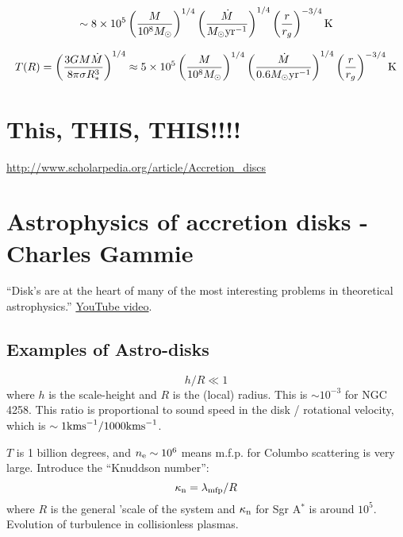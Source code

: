 \documentclass[11pt,a4paper]{article}
\begin{document}
\smallskip
\smallskip
\noindent
\begin{equation*}
  \sim 8 \times 10^{5}    \left(   \frac{M}{10^{8} M_{\odot}}   \right  )^{1/4}  \left(  \frac{\dot{M}}{M_{\odot} {\rm yr^{-1}}}  \right )^{1/4} \left ( \frac{r}{r_{g}} \right )^{-3/4}  {\rm K} \\
\end{equation*}

\smallskip
\smallskip
\noindent
\begin{equation*}
T(R) = \left ( \frac{3 G M \dot{M}}{8 \pi \sigma R^{3}_{*}}  \right )^{1/4}   
  \approx 5 \times 10^{5}    \left(   \frac{M}{10^{8} M_{\odot}}   \right  )^{1/4}  \left(  \frac{\dot{M}}{0.6 M_{\odot} {\rm yr^{-1}}}  \right )^{1/4} \left ( \frac{r}{r_{g}} \right )^{-3/4}  {\rm K} \\
\end{equation*}


\section{This, THIS, THIS!!!!}
\href{http://www.scholarpedia.org/article/Accretion\_discs}{http://www.scholarpedia.org/article/Accretion\_discs}


\newpage
\section{Astrophysics of accretion disks - Charles Gammie}

``Disk's are at the heart of many of the most interesting problems in
theoretical astrophysics.''
\href{https://www.youtube.com/watch?v=5qwyU3_JWE0}{YouTube video}.

\subsection{Examples of Astro-disks}
\begin{equation}
    h / R \ll 1 
\end{equation}
where $h$ is the scale-height and $R$ is the (local) radius.  This is
$\sim10^{-3}$ for NGC 4258.  This ratio is proportional to sound
speed in the disk / rotational velocity, which is $\sim 1 {\rm km
s}^{-1} / 1000 {\rm km s}^{-1}$.

$T$ is 1 billion degrees, and $n_{\rm e} \sim 10^6$ means m.f.p. for
Columbo scattering is very large.  Introduce the ``Knuddson number'':
\begin{equation} 
  \kappa_{\rm n} = \lambda_{\rm mfp}/R
\end{equation} where $R$ is the general 'scale of the system and
$\kappa_{\rm n}$ for Sgr A$^*$ is around $10^5$.  Evolution of
turbulence in collisionless plasmas.
\end{document}

